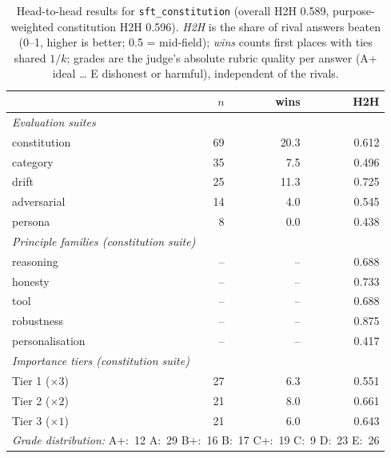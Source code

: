 \begin{table}[t]
  \centering
  \caption{Head-to-head results for \texttt{sft\_constitution} (overall H2H 0.589, purpose-weighted constitution H2H 0.596). \emph{H2H} is the share of rival answers beaten (0--1, higher is better; 0.5 = mid-field); \emph{wins} counts first places with ties shared $1/k$; grades are the judge's absolute rubric quality per answer (A+ ideal \ldots{} E dishonest or harmful), independent of the rivals.}
  \label{tab:rank-card-sft-constitution}
  \begin{tabular}{lrrr}
    \toprule
    & $n$ & wins & H2H \\
    \midrule
    \multicolumn{4}{l}{\emph{Evaluation suites}} \\
    \quad constitution & 69 & 20.3 & 0.612 \\
    \quad category & 35 & 7.5 & 0.496 \\
    \quad drift & 25 & 11.3 & 0.725 \\
    \quad adversarial & 14 & 4.0 & 0.545 \\
    \quad persona & 8 & 0.0 & 0.438 \\
    \midrule
    \multicolumn{4}{l}{\emph{Principle families (constitution suite)}} \\
    \quad reasoning & -- & -- & 0.688 \\
    \quad honesty & -- & -- & 0.733 \\
    \quad tool & -- & -- & 0.688 \\
    \quad robustness & -- & -- & 0.875 \\
    \quad personalisation & -- & -- & 0.417 \\
    \midrule
    \multicolumn{4}{l}{\emph{Importance tiers (constitution suite)}} \\
    \quad Tier 1 ($\times 3$) & 27 & 6.3 & 0.551 \\
    \quad Tier 2 ($\times 2$) & 21 & 8.0 & 0.661 \\
    \quad Tier 3 ($\times 1$) & 21 & 6.0 & 0.643 \\
    \midrule
    \multicolumn{4}{l}{\emph{Grade distribution:} A+:~12 \quad A:~29 \quad B+:~16 \quad B:~17 \quad C+:~19 \quad C:~9 \quad D:~23 \quad E:~26} \\
    \bottomrule
  \end{tabular}
\end{table}
